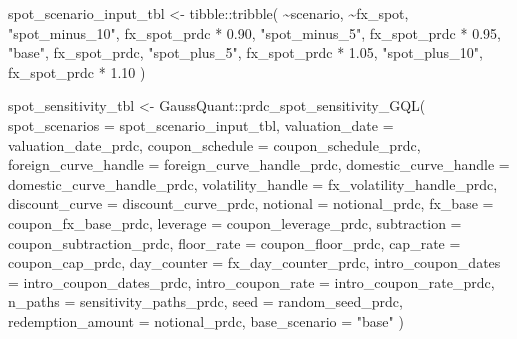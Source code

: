 \documentclass[
  letterpaper,
  DIV=11,
  numbers=noendperiod]{scrreprt}
\newenvironment{Shaded}{\begin{snugshade}}{\end{snugshade}}
\newcommand{\AttributeTok}[1]{\textcolor[rgb]{0.40,0.45,0.13}{#1}}
\newcommand{\FloatTok}[1]{\textcolor[rgb]{0.68,0.00,0.00}{#1}}
\newcommand{\FunctionTok}[1]{\textcolor[rgb]{0.28,0.35,0.67}{#1}}
\newcommand{\NormalTok}[1]{\textcolor[rgb]{0.00,0.23,0.31}{#1}}
\newcommand{\OtherTok}[1]{\textcolor[rgb]{0.00,0.23,0.31}{#1}}
\newcommand{\SpecialCharTok}[1]{\textcolor[rgb]{0.37,0.37,0.37}{#1}}
\newcommand{\StringTok}[1]{\textcolor[rgb]{0.13,0.47,0.30}{#1}}
\begin{document}
\begin{Shaded}
\begin{Highlighting}[]
\NormalTok{spot\_scenario\_input\_tbl }\OtherTok{\textless{}{-}}\NormalTok{ tibble}\SpecialCharTok{::}\FunctionTok{tribble}\NormalTok{(}
  \SpecialCharTok{\textasciitilde{}}\NormalTok{scenario,       }\SpecialCharTok{\textasciitilde{}}\NormalTok{fx\_spot,}
  \StringTok{"spot\_minus\_10"}\NormalTok{,  fx\_spot\_prdc }\SpecialCharTok{*} \FloatTok{0.90}\NormalTok{,}
  \StringTok{"spot\_minus\_5"}\NormalTok{,   fx\_spot\_prdc }\SpecialCharTok{*} \FloatTok{0.95}\NormalTok{,}
  \StringTok{"base"}\NormalTok{,           fx\_spot\_prdc,}
  \StringTok{"spot\_plus\_5"}\NormalTok{,    fx\_spot\_prdc }\SpecialCharTok{*} \FloatTok{1.05}\NormalTok{,}
  \StringTok{"spot\_plus\_10"}\NormalTok{,   fx\_spot\_prdc }\SpecialCharTok{*} \FloatTok{1.10}
\NormalTok{)}

\NormalTok{spot\_sensitivity\_tbl }\OtherTok{\textless{}{-}}\NormalTok{ GaussQuant}\SpecialCharTok{::}\FunctionTok{prdc\_spot\_sensitivity\_GQL}\NormalTok{(}
  \AttributeTok{spot\_scenarios =}\NormalTok{ spot\_scenario\_input\_tbl,}
  \AttributeTok{valuation\_date =}\NormalTok{ valuation\_date\_prdc,}
  \AttributeTok{coupon\_schedule =}\NormalTok{ coupon\_schedule\_prdc,}
  \AttributeTok{foreign\_curve\_handle =}\NormalTok{ foreign\_curve\_handle\_prdc,}
  \AttributeTok{domestic\_curve\_handle =}\NormalTok{ domestic\_curve\_handle\_prdc,}
  \AttributeTok{volatility\_handle =}\NormalTok{ fx\_volatility\_handle\_prdc,}
  \AttributeTok{discount\_curve =}\NormalTok{ discount\_curve\_prdc,}
  \AttributeTok{notional =}\NormalTok{ notional\_prdc,}
  \AttributeTok{fx\_base =}\NormalTok{ coupon\_fx\_base\_prdc,}
  \AttributeTok{leverage =}\NormalTok{ coupon\_leverage\_prdc,}
  \AttributeTok{subtraction =}\NormalTok{ coupon\_subtraction\_prdc,}
  \AttributeTok{floor\_rate =}\NormalTok{ coupon\_floor\_prdc,}
  \AttributeTok{cap\_rate =}\NormalTok{ coupon\_cap\_prdc,}
  \AttributeTok{day\_counter =}\NormalTok{ fx\_day\_counter\_prdc,}
  \AttributeTok{intro\_coupon\_dates =}\NormalTok{ intro\_coupon\_dates\_prdc,}
  \AttributeTok{intro\_coupon\_rate =}\NormalTok{ intro\_coupon\_rate\_prdc,}
  \AttributeTok{n\_paths =}\NormalTok{ sensitivity\_paths\_prdc,}
  \AttributeTok{seed =}\NormalTok{ random\_seed\_prdc,}
  \AttributeTok{redemption\_amount =}\NormalTok{ notional\_prdc,}
  \AttributeTok{base\_scenario =} \StringTok{"base"}
\NormalTok{)}


\end{Highlighting}
\end{Shaded}
\end{document}
